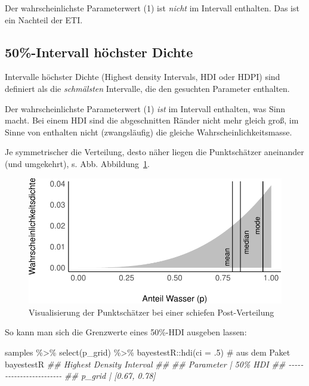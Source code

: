 \documentclass[
  a4paper,
  DIV=11]{scrreprt}
\newenvironment{Shaded}{\begin{snugshade}}{\end{snugshade}}
\newcommand{\AttributeTok}[1]{\textcolor[rgb]{0.40,0.45,0.13}{#1}}
\newcommand{\CommentTok}[1]{\textcolor[rgb]{0.37,0.37,0.37}{#1}}
\newcommand{\DecValTok}[1]{\textcolor[rgb]{0.68,0.00,0.00}{#1}}
\newcommand{\DocumentationTok}[1]{\textcolor[rgb]{0.37,0.37,0.37}{\textit{#1}}}
\newcommand{\FunctionTok}[1]{\textcolor[rgb]{0.28,0.35,0.67}{#1}}
\newcommand{\NormalTok}[1]{\textcolor[rgb]{0.00,0.23,0.31}{#1}}
\newcommand{\SpecialCharTok}[1]{\textcolor[rgb]{0.37,0.37,0.37}{#1}}
\theoremstyle{definition}
\theoremstyle{remark}
\begin{document}
Der wahrscheinlichste Parameterwert (1) ist \emph{nicht} im Intervall
enthalten. Das ist ein Nachteil der ETI.

\hypertarget{intervall-huxf6chster-dichte}{%
\subsection{50\%-Intervall höchster
Dichte}\label{intervall-huxf6chster-dichte}}

Intervalle höchster Dichte (Highest density Intervals, HDI oder HDPI)
sind definiert als die \emph{schmälsten} Intervalle, die den gesuchten
Parameter enthalten.

Der wahrscheinlichste Parameterwert (1) \emph{ist} im Intervall
enthalten, was Sinn macht. Bei einem HDI sind die abgeschnitten Ränder
nicht mehr gleich groß, im Sinne von enthalten nicht (zwangsläufig) die
gleiche Wahrscheinlichkeitsmasse.

Je symmetrischer die Verteilung, desto näher liegen die Punktschätzer
aneinander (und umgekehrt), s. Abb.
Abbildung~\ref{fig-post-pointestimates}.

\begin{figure}

{\centering \includegraphics{./Post_files/figure-pdf/fig-post-pointestimates-1.pdf}

}

\caption{\label{fig-post-pointestimates}Visualisierung der Punktschätzer
bei einer schiefen Post-Verteilung}

\end{figure}

So kann man sich die Grenzwerte eines 50\%-HDI ausgeben lassen:

\begin{Shaded}
\begin{Highlighting}[]
\NormalTok{samples }\SpecialCharTok{\%\textgreater{}\%} 
  \FunctionTok{select}\NormalTok{(p\_grid) }\SpecialCharTok{\%\textgreater{}\%} 
\NormalTok{  bayestestR}\SpecialCharTok{::}\FunctionTok{hdi}\NormalTok{(}\AttributeTok{ci =}\NormalTok{ .}\DecValTok{5}\NormalTok{)  }\CommentTok{\# aus dem Paket \textasciigrave{}bayestestR\textasciigrave{}}
\DocumentationTok{\#\# Highest Density Interval}
\DocumentationTok{\#\# }
\DocumentationTok{\#\# Parameter |      50\% HDI}
\DocumentationTok{\#\# {-}{-}{-}{-}{-}{-}{-}{-}{-}{-}{-}{-}{-}{-}{-}{-}{-}{-}{-}{-}{-}{-}{-}{-}}
\DocumentationTok{\#\# p\_grid    | [0.67, 0.78]}
\end{Highlighting}
\end{Shaded}
\end{document}
